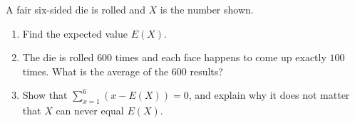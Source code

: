 A fair six-sided die is rolled and $X$ is the number shown.
\begin{enumerate}
\item[(a)] Find the expected value $E(X)$.
\item[(b)] The die is rolled $600$ times and each face happens to come up exactly $100$ times. What is the average of the $600$ results?
\item[(c)] Show that $\displaystyle\sum_{x=1}^{6}\left(x-E(X)\right)=0$, and explain why it does not matter that $X$ can never equal $E(X)$.
\end{enumerate}
